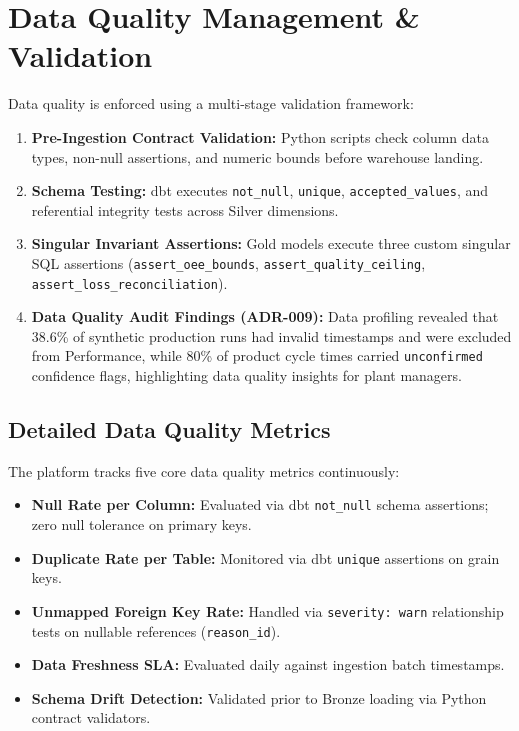 \documentclass[12pt, a4paper]{report}
\begin{document}
\section{Data Quality Management \& Validation}
Data quality is enforced using a multi-stage validation framework:
\begin{enumerate}
    \item \textbf{Pre-Ingestion Contract Validation:} Python scripts check column data types, non-null assertions, and numeric bounds before warehouse landing.
    \item \textbf{Schema Testing:} dbt executes \texttt{not\_null}, \texttt{unique}, \texttt{accepted\_values}, and referential integrity tests across Silver dimensions.
    \item \textbf{Singular Invariant Assertions:} Gold models execute three custom singular SQL assertions (\texttt{assert\_oee\_bounds}, \texttt{assert\_quality\_ceiling}, \texttt{assert\_loss\_reconciliation}).
    \item \textbf{Data Quality Audit Findings (ADR-009):} Data profiling revealed that 38.6\% of synthetic production runs had invalid timestamps and were excluded from Performance, while 80\% of product cycle times carried \texttt{unconfirmed} confidence flags, highlighting data quality insights for plant managers.
\end{enumerate}

\subsection{Detailed Data Quality Metrics}
The platform tracks five core data quality metrics continuously:
\begin{itemize}
    \item \textbf{Null Rate per Column:} Evaluated via dbt \texttt{not\_null} schema assertions; zero null tolerance on primary keys.
    \item \textbf{Duplicate Rate per Table:} Monitored via dbt \texttt{unique} assertions on grain keys.
    \item \textbf{Unmapped Foreign Key Rate:} Handled via \texttt{severity: warn} relationship tests on nullable references (\texttt{reason\_id}).
    \item \textbf{Data Freshness SLA:} Evaluated daily against ingestion batch timestamps.
    \item \textbf{Schema Drift Detection:} Validated prior to Bronze loading via Python contract validators.
\end{itemize}
\end{document}
